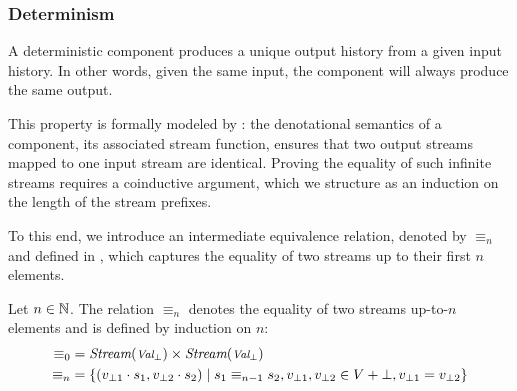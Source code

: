 \subsubsection{Determinism}
\label{sec:semantics:grsync:theorems:determinism}

A deterministic component produces a unique output history from a given input history. In other
words, given the same input, the component will always produce the same output.

This property is formally modeled by : the
denotational semantics of a component, \ie its associated stream function, ensures that two output
streams mapped to one input stream are identical.
%
Proving the equality of such infinite streams requires a coinductive argument, which we structure as
an induction on the length of the stream prefixes.

To this end, we introduce an intermediate equivalence relation, denoted by $\equiv_n$ and defined in
, which captures the equality of two
streams up to their first $n$ elements.

\begin{definition}[Equivalence up-to-$n$]
    \label{def:semantics:grsync:theorems:determinism:equiv_upto_n}
    Let $n \in \mathbb{N}$.
    The relation $\equiv_n$ denotes the equality of two streams up-to-$n$ elements and is defined
    by induction on $n$:
    \begin{align}
        \equiv_0 & = \textit{Stream}(\mbox{\footnotesize\ensuremath{\textit{Val}_\bot}}) \times \textit{Stream}(\mbox{\footnotesize\ensuremath{\textit{Val}_\bot}}) \label{def:semantics:grsync:theorems:determinism:equiv0} \\
        \equiv_n & = \{ (v_{\bot1} \cdot s_1, v_{\bot2} \cdot s_2) \mid s_1 \equiv_{n-1} s_2,
        v_{\bot1}, v_{\bot2} \in V + \bot, v_{\bot1} = v_{\bot2} \} \label{def:semantics:grsync:theorems:determinism:equivn}
    \end{align}
\end{definition}

